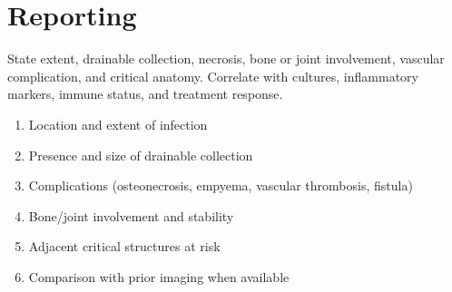 \section{Reporting}
State extent, drainable collection, necrosis, bone or joint involvement, vascular complication, and critical anatomy. Correlate with cultures, inflammatory markers, immune status, and treatment response.

\begin{pearlbox}
\begin{enumerate}
  \item Location and extent of infection
  \item Presence and size of drainable collection
  \item Complications (osteonecrosis, empyema, vascular thrombosis, fistula)
  \item Bone/joint involvement and stability
  \item Adjacent critical structures at risk
  \item Comparison with prior imaging when available
\end{enumerate}
\end{pearlbox}

\clearpage
